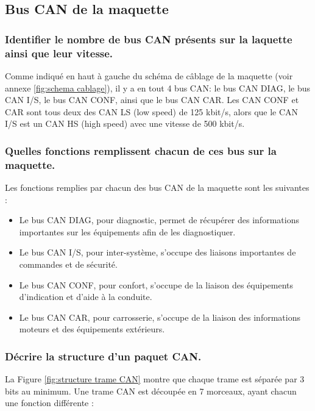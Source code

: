 \documentclass{rapportECC}
\begin{document}
\subsection{Bus CAN de la maquette}

\subsubsection*{Identifier le nombre de bus CAN présents sur la laquette ainsi que leur vitesse.}

Comme indiqué en haut à gauche du schéma de câblage de la maquette (voir annexe \ref{fig:schema cablage}), il y a en tout 4 bus CAN: le bus CAN DIAG, le bus CAN I/S, le bus CAN CONF, ainsi que le bus CAN CAR. Les CAN CONF et CAR sont tous deux des CAN LS (low speed) de 125 kbit/s, alors que le CAN I/S est un CAN HS (high speed) avec une vitesse de 500 kbit/s.

\subsubsection*{Quelles fonctions remplissent chacun de ces bus sur la maquette.}

Les fonctions remplies par chacun des bus CAN de la maquette sont les suivantes :

\begin{itemize}
    \item Le bus CAN DIAG, pour diagnostic, permet de récupérer des informations importantes sur les équipements afin de les diagnostiquer.
    \item Le bus CAN I/S, pour inter-système, s'occupe des liaisons importantes de commandes et de sécurité.
    \item Le bus CAN CONF, pour confort, s'occupe de la liaison des équipements d'indication et d'aide à la conduite.
    \item Le bus CAN CAR, pour carrosserie, s'occupe de la liaison des informations moteurs et des équipements extérieurs.
\end{itemize}

\subsubsection*{Décrire la structure d'un paquet CAN.}

La Figure \ref{fig:structure trame CAN} montre que chaque trame est séparée par 3 bits au minimum. Une trame CAN est découpée en 7 morceaux, ayant chacun une fonction différente :
\end{document}
